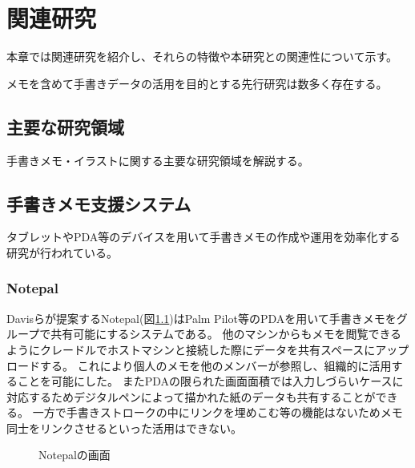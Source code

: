 \chapter{関連研究}
\label{chap:kanren}

本章では関連研究を紹介し、それらの特徴や本研究との関連性について示す。

\newpage

メモを含めて手書きデータの活用を目的とする先行研究は数多く存在する。

\section{主要な研究領域}
手書きメモ・イラストに関する主要な研究領域を解説する。

\section{手書きメモ支援システム}
タブレットやPDA等のデバイスを用いて手書きメモの作成や運用を効率化する研究が行われている。

\subsection{Notepal}
Davisらが提案するNotepal\cite{Davis1999NotePalsLN}(図\ref{notepal})はPalm Pilot等のPDAを用いて手書きメモをグループで共有可能にするシステムである。
他のマシンからもメモを閲覧できるようにクレードルでホストマシンと接続した際にデータを共有スペースにアップロードする。
これにより個人のメモを他のメンバーが参照し、組織的に活用することを可能にした。
またPDAの限られた画面面積では入力しづらいケースに対応するためデジタルペンによって描かれた紙のデータも共有することができる。
一方で手書きストロークの中にリンクを埋めこむ等の機能はないためメモ同士をリンクさせるといった活用はできない。

\begin{figure}[H]
    \centering
    \caption{Notepalの画面}
    \label{notepal}
\end{figure}

